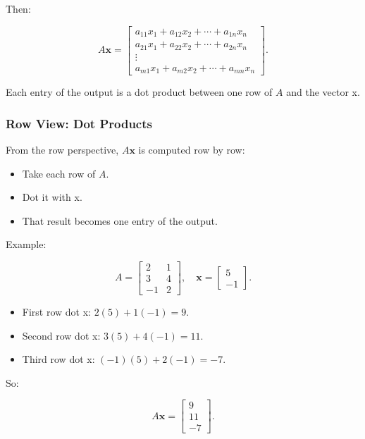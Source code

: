 \documentclass[
  letterpaper,
  DIV=11,
  numbers=noendperiod]{scrreprt}
\providecommand{\tightlist}{%
  \setlength{\itemsep}{0pt}\setlength{\parskip}{0pt}}
\begin{document}
Then:

\[
A\mathbf{x} =
\begin{bmatrix} 
a_{11}x_1 + a_{12}x_2 + \cdots + a_{1n}x_n \\ 
a_{21}x_1 + a_{22}x_2 + \cdots + a_{2n}x_n \\ 
\vdots \\ 
a_{m1}x_1 + a_{m2}x_2 + \cdots + a_{mn}x_n
\end{bmatrix}.
\]

Each entry of the output is a dot product between one row of \(A\) and
the vector x.

\subsubsection{Row View: Dot Products}\label{row-view-dot-products}

From the row perspective, \(A\mathbf{x}\) is computed row by row:

\begin{itemize}
\tightlist
\item
  Take each row of \(A\).
\item
  Dot it with x.
\item
  That result becomes one entry of the output.
\end{itemize}

Example:

\[
A =
\begin{bmatrix} 
2 & 1 \\ 
3 & 4 \\ 
-1 & 2 
\end{bmatrix}, \quad
\mathbf{x} =
\begin{bmatrix} 
5 \\ 
-1
\end{bmatrix}.
\]

\begin{itemize}
\tightlist
\item
  First row dot x: \(2(5) + 1(-1) = 9\).
\item
  Second row dot x: \(3(5) + 4(-1) = 11\).
\item
  Third row dot x: \((-1)(5) + 2(-1) = -7\).
\end{itemize}

So:

\[
A\mathbf{x} = 
\begin{bmatrix} 
9 \\ 11 \\ -7
\end{bmatrix}.
\]
\end{document}
